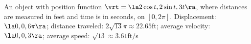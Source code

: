 {An object with position function $\vrt = \la 2\cos t,2\sin t, 3t\ra$, where distances are measured in feet and time is in seconds, on $[0,2\pi]$.
}
{Displacement: $\la 0,0,6\pi\ra$; distance traveled: $2\sqrt{13}\pi \approx 22.65$ft; average velocity: $\la 0,0,3\ra$; average speed: $\sqrt{13} \approx 3.61$ft/s
}